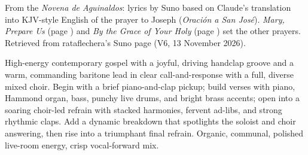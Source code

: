 
\label{sec:joseph-bring-us-close-to-jesus}
\begin{notes}
From the \emph{Novena de Aguinaldos}: lyrics by Suno based on Claude's translation into KJV-style English of the prayer to Joseph (\emph{Oración a San José}). \emph{Mary, Prepare Us} (page \pageref{sec:mary-prepare-us}) and \emph{By the Grace of Your Holy} (page \pageref{sec:by-the-grace-of-your-holy}) set the other prayers. Retrieved from rataflechera's Suno page (V6, 13 November 2026).
\end{notes}
\begin{style}
High-energy contemporary gospel with a joyful, driving handclap groove and a warm, commanding baritone lead in clear call-and-response with a full, diverse mixed choir. Begin with a brief piano-and-clap pickup; build verses with piano, Hammond organ, bass, punchy live drums, and bright brass accents; open into a soaring choir-led refrain with stacked harmonies, fervent ad-libs, and strong rhythmic claps. Add a dynamic breakdown that spotlights the soloist and choir answering, then rise into a triumphant final refrain. Organic, communal, polished live-room energy, crisp vocal-forward mix.
\end{style}
